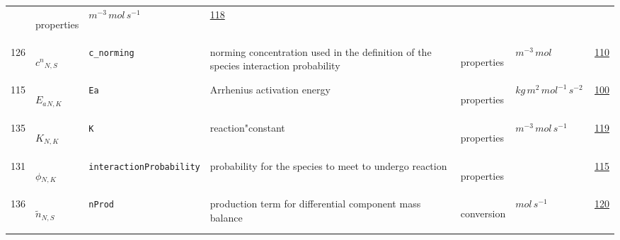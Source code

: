 \begin{longtable}{|p{1cm}|p{2.5cm}|p{4.5cm}|p{8cm}|p{3.0cm}|p{3cm}|p{1cm}|}
             & \begin{lay}properties \end{lay}
             & $ m^{-3} \,mol \,s^{-1} \, $
             &                 \hyperlink{"e:118"}{ 118 }
                 \\
            126
             & \hypertarget{"v:126"}{ $ {c^n}{_{N, S}} $}
             & \verb|c_norming|
             & norming concentration used in the definition of the species interaction probability
             & \begin{lay}properties \end{lay}
             & $ m^{-3} \,mol \, $
             &                 \hyperlink{"e:110"}{ 110 }
                 \\
            115
             & \hypertarget{"v:115"}{ $ {E_a}{_{N, K}} $}
             & \verb|Ea|
             & Arrhenius activation energy
             & \begin{lay}properties \end{lay}
             & $ kg \,m^{2} \,mol^{-1} \,s^{-2} \, $
             &                 \hyperlink{"e:100"}{ 100 }
                 \\
            135
             & \hypertarget{"v:135"}{ $ {K}{_{N, K}} $}
             & \verb|K|
             & reaction"constant
             & \begin{lay}properties \end{lay}
             & $ m^{-3} \,mol \,s^{-1} \, $
             &                 \hyperlink{"e:119"}{ 119 }
                 \\
            131
             & \hypertarget{"v:131"}{ $ {\phi}{_{N, K}} $}
             & \verb|interactionProbability|
             & probability for the species to meet to undergo reaction
             & \begin{lay}properties \end{lay}
             & $  $
             &                 \hyperlink{"e:115"}{ 115 }
                 \\
            136
             & \hypertarget{"v:136"}{ $ {{\tilde{n}}}{_{N, S}} $}
             & \verb|nProd|
             & production term for differential component mass balance
             & \begin{lay}conversion \end{lay}
             & $ mol \,s^{-1} \, $
             &                 \hyperlink{"e:120"}{ 120 }
                 \\
    \end{longtable}